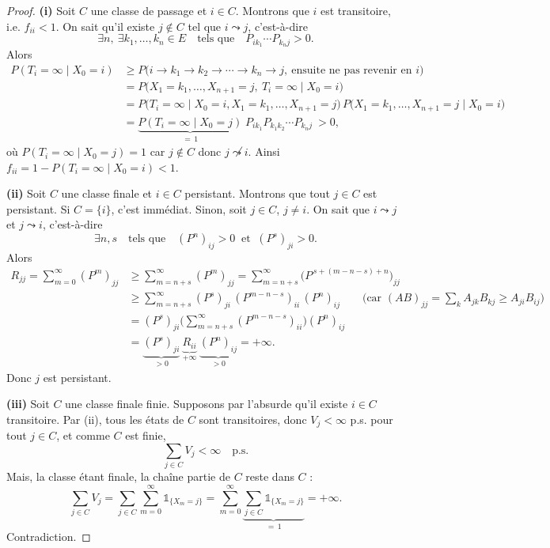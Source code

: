 \begin{proof}
\textbf{(i)} Soit $C$ une classe de passage et $i \in C$. Montrons que $i$ est transitoire, i.e. $f_{ii} < 1$.
On sait qu'il existe $j \notin C$ tel que $i \leadsto j$, c'est-à-dire
\[
\exists n,\ \exists k_1, \dots, k_n \in E \quad \text{tels que} \quad P_{ik_1} \cdots P_{k_n j} > 0 .
\]
Alors
\begin{align*}
P(T_i = \infty \mid X_0 = i)
&\geq P\big( i \to k_1 \to k_2 \to \cdots \to k_n \to j,\ \text{ensuite ne pas revenir en } i \big) \\
&= P\big( X_1 = k_1, \dots, X_{n+1} = j,\ T_i = \infty \mid X_0 = i \big) \\
&= P\big( T_i = \infty \mid X_0 = i, X_1 = k_1, \dots, X_{n+1} = j \big)\,
   P\big( X_1 = k_1, \dots, X_{n+1} = j \mid X_0 = i \big) \\
&= \underbrace{P(T_i = \infty \mid X_0 = j)}_{=\,1}\;
   P_{ik_1} P_{k_1 k_2} \cdots P_{k_n j} \ > 0 ,
\end{align*}
où $P(T_i = \infty \mid X_0 = j) = 1$ car $j \notin C$ donc $j \not\leadsto i$.
Ainsi $f_{ii} = 1 - P(T_i = \infty \mid X_0 = i) < 1$.

\medskip
\textbf{(ii)} Soit $C$ une classe finale et $i \in C$ persistant. Montrons que tout $j \in C$ est persistant.
Si $C = \{i\}$, c'est immédiat. Sinon, soit $j \in C$, $j \neq i$. On sait que $i \leadsto j$ et $j \leadsto i$, c'est-à-dire
\[
\exists n, s \quad \text{tels que} \quad (P^n)_{ij} > 0 \ \text{ et } \ (P^s)_{ji} > 0 .
\]
Alors
\begin{align*}
R_{jj} = \sum_{m=0}^{\infty} (P^m)_{jj}
&\geq \sum_{m=n+s}^{\infty} (P^m)_{jj}
 = \sum_{m=n+s}^{\infty} \big(P^{\,s + (m-n-s) + n}\big)_{jj} \\
&\geq \sum_{m=n+s}^{\infty} (P^s)_{ji}\,(P^{m-n-s})_{ii}\,(P^n)_{ij}
\qquad \Big(\text{car } (AB)_{jj} = \sum_k A_{jk} B_{kj} \geq A_{ji} B_{ij}\Big) \\
&= (P^s)_{ji} \Big( \sum_{m=n+s}^{\infty} (P^{m-n-s})_{ii} \Big) (P^n)_{ij} \\
&= \underbrace{(P^s)_{ji}}_{>0}\ \underbrace{R_{ii}}_{+\infty}\ \underbrace{(P^n)_{ij}}_{>0} = +\infty .
\end{align*}
Donc $j$ est persistant.

\medskip
\textbf{(iii)} Soit $C$ une classe finale finie. Supposons par l'absurde qu'il existe $i \in C$ transitoire.
Par (ii), tous les états de $C$ sont transitoires, donc $V_j < \infty$ p.s. pour tout $j \in C$, et comme $C$ est finie,
\[
\sum_{j \in C} V_j < \infty \quad \text{p.s.}
\]
Mais, la classe étant finale, la chaîne partie de $C$ reste dans $C$ :
\[
\sum_{j \in C} V_j = \sum_{j \in C} \sum_{m=0}^{\infty} \mathbb{1}_{\{X_m = j\}}
= \sum_{m=0}^{\infty} \underbrace{\sum_{j \in C} \mathbb{1}_{\{X_m = j\}}}_{=\,1} = +\infty .
\]
Contradiction.
\end{proof}

